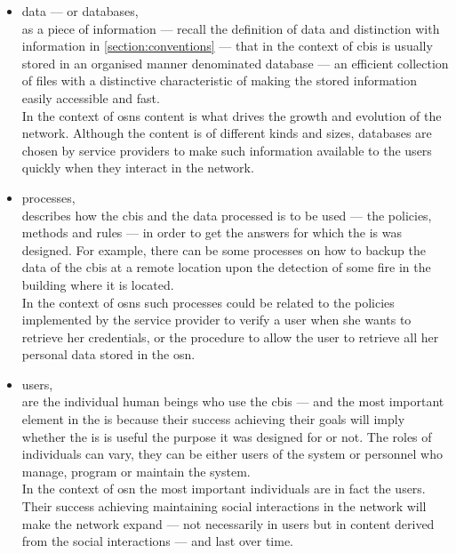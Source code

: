 \documentclass[showtrims, oldfontcommands]{kthesis}
\begin{document}
\begin{itemize}
    \item data --- or databases,\\
    as a piece of information --- recall the definition of data and distinction 
    with information in \cref{section:conventions} --- that in the context of \ac{cbis}
    is usually stored in an organised manner denominated database --- an efficient 
    collection of files with a distinctive characteristic of making the stored information 
    easily accessible and fast.\\
    In the context of \acp{osn} content is what drives the growth and evolution 
    of the network. Although the content is of different kinds and sizes, databases 
    are chosen by service providers to make such information available to the users 
    quickly when they interact in the network.
    
    \item processes,\\
    describes how the \ac{cbis} and the data processed is to be used --- the policies, 
    methods and rules --- in order to get the answers for which the \ac{is} was 
    designed. For example, there can be some processes on how to backup the data 
    of the \ac{cbis} at a remote location upon the detection of some fire in the 
    building where it is located.\\
    In the context of \acp{osn} such processes could be related to the policies 
    implemented by the service provider to verify a user when she wants to retrieve 
    her credentials, or the procedure to allow the user to retrieve all her personal 
    data stored in the \ac{osn}.
    
    \item users,\\
    are the individual human beings who use the \ac{cbis} --- and the most important 
    element in the \ac{is} because their success achieving their goals will imply 
    whether the \ac{is} is useful the purpose it was designed for or not. The roles 
    of individuals can vary, they can be either users of the system or personnel 
    who manage, program or maintain the system.\\
    In the context of \ac{osn} the most important individuals are in fact the users. 
    Their success achieving maintaining social interactions in the network will 
    make the network expand --- not necessarily in users but in content derived 
    from the social interactions --- and last over time.
    
\end{itemize}
\end{document}
